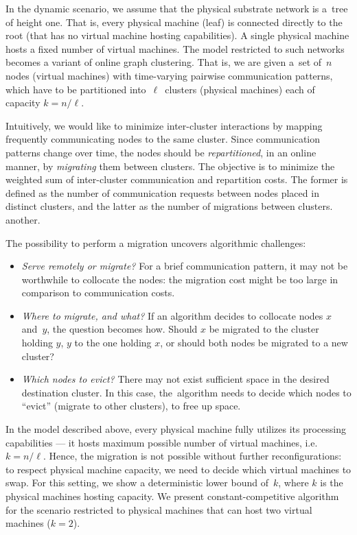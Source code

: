In the dynamic scenario, we assume that the physical substrate network is a~tree of height one.
That is, every physical machine (leaf) is connected directly to the root (that has no virtual machine hosting capabilities).
A single physical machine hosts a fixed number of virtual machines.
The model restricted to such networks becomes a variant of online graph clustering.
That is, we are given a~set of~$n$ nodes (virtual machines) with time-varying pairwise
communication patterns, which have to be partitioned into~$\ell$~clusters (physical machines) each of
capacity $k=n/\ell$.

Intuitively, we would like to minimize inter-cluster
interactions by mapping frequently communicating nodes to the same cluster.
Since communication patterns change over time, the nodes should be \emph{repartitioned}, in
an online manner, by \emph{migrating} them between clusters.
The objective is to minimize the weighted sum of inter-cluster communication and repartition costs.
The former is defined as the number of communication requests between nodes placed in distinct clusters, and the latter as the number of migrations between clusters.
another.


The possibility to perform a migration uncovers algorithmic challenges:
\begin{itemize}

\item \emph{Serve remotely or migrate?} For a brief communication
pattern, it may not be worthwhile to collocate the nodes: the migration cost might
be too large in comparison to communication costs.

\item \emph{Where to migrate, and what?}
If an algorithm decides to collocate nodes $x$ and~$y$, the question becomes
how. Should $x$ be migrated to the cluster holding $y$, $y$ to the one holding
$x$, or should both nodes be migrated to a new cluster?

\item \emph{Which nodes to evict?}
There may not exist sufficient space in the desired destination cluster. In
this case, the~algorithm needs to decide which nodes to ``evict'' (migrate to
other clusters), to free up space.

\end{itemize}

In the model described above, every physical machine fully utilizes its processing capabilities --- it hosts maximum possible number of virtual machines, i.e. $k=n/\ell$.
Hence, the migration is not possible without further reconfigurations: to respect physical machine capacity, we need to decide which virtual machines to swap.
For this setting, we show a deterministic lower bound of~$k$, where $k$ is the physical machines hosting capacity.
We present constant-competitive algorithm for the scenario restricted to physical machines that can host two virtual machines ($k = 2$).

